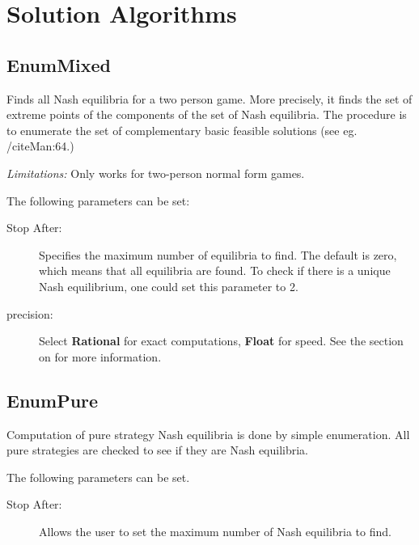 \documentclass[12pt]{report}
\begin{document}
\section{Solution Algorithms}\label{SolutionAlgorithms}

\subsection{EnumMixed}\label{EnumMixed}
Finds all Nash equilibria for a two person game.  More precisely, it
finds the set of extreme points of the components of the set of Nash
equilibria.  The procedure is to enumerate the set of complementary
basic feasible solutions (see eg. /cite{Man:64}.)

{\em Limitations:} Only works for two-person normal form games.

The following parameters can be set:

\begin{description}
\item[Stop After:] Specifies the maximum number of equilibria to find.  The
default is zero, which means that all equilibria are found.  To check if
there is a unique Nash equilibrium, one could set this parameter to 2.
\item[precision:] Select {\bf Rational} for exact computations, {\bf 
Float} for speed. See the section on 
for more information.
\end{description}

\subsection{EnumPure}\label{EnumPure}
Computation of pure strategy Nash equilibria is done by simple enumeration.
All pure strategies are checked to see if they are Nash equilibria.  

The following parameters can be set. 

\begin{description}
\item[Stop After:] Allows the user to set the maximum number of Nash
equilibria to find. 
\end{description}
\end{document}

